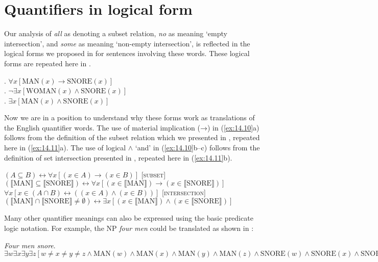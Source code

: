 \section{Quantifiers in logical form}\label{sec:14.3}

Our analysis of \textit{all} as denoting a subset relation, \textit{no} as meaning ‘empty intersection’, and \textit{some} as meaning ‘non-empty intersection’, is reflected in the logical forms we proposed in  for sentences involving these words. These logical forms are repeated here in .


\ea \label{ex:14.10}
.  $\forall x [\text{MAN}(x) \rightarrow \text{SNORE}(x)]$\\
.  $\neg\exists x[\text{WOMAN}(x) \wedge \text{SNORE}(x)]$\\
.  $\exists x[\text{MAN}(x) \wedge \text{SNORE}(x)]$
     \z
\z


Now we are in a position to understand why these forms work as translations of the English quantifier words. The use of material implication (→) in (\ref{ex:14.10}a) follows from the definition of the subset relation which we presented in , repeated here in (\ref{ex:14.11}a). The use of logical $\wedge$ ‘and’ in (\ref{ex:14.10}b--c) follows from the definition of set intersection presented in , repeated here in (\ref{ex:14.11}b).


\ea \label{ex:14.11}
\ea $(A \subseteq B)  \leftrightarrow   \forall x[(x \in A) \rightarrow (x \in B)]$  \hfill [\textsc{subset}] \\
$(\llbracket \text{MAN} \rrbracket \subseteq \llbracket \text{SNORE} \rrbracket )  \leftrightarrow   \forall x[(x \in \llbracket \text{MAN}\rrbracket ) \rightarrow (x \in \llbracket \text{SNORE} \rrbracket )]$
\ex  $\forall x[x \in (A \cap B)  \leftrightarrow   ((x \in A) \wedge (x \in B))]$  \hfill [\textsc{intersection}] \\
$(\llbracket \text{MAN}\rrbracket \cap \llbracket \text{SNORE}\rrbracket \neq \emptyset) \leftrightarrow  \exists x[(x \in \llbracket \text{MAN} \rrbracket) \wedge (x \in \llbracket \text{SNORE} \rrbracket)]$
\z \z

Many other quantifier meanings can also be expressed using the basic predicate logic notation. For example, the NP \textit{four men} could be translated as shown in :


\ea \label{ex:14.12}
\textit{Four men snore}.\\
$\exists w \exists x \exists y \exists z [w\neq x \neq y \neq z \wedge \text{MAN}(w) \wedge \text{MAN}(x) \wedge \text{MAN}(y) \wedge \text{MAN}(z) \wedge \text{SNORE}(w) \wedge \text{SNORE}(x) \wedge \text{SNORE}(y) \wedge \text{SNORE}(z)]$
\z


